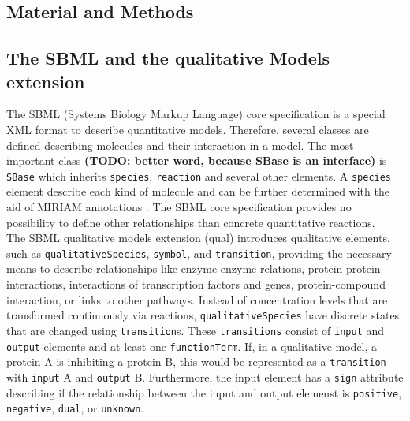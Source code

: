 \documentclass{bioinfo}
\begin{document}
\begin{methods}
\section{Material and Methods}
\subsection{The SBML and the qualitative Models extension}
The SBML (Systems Biology Markup Language) core specification is a special XML format to describe quantitative models. Therefore, several classes are defined describing molecules and their interaction in a model.
The most important class \textbf{(TODO: better word, because SBase is an interface)} is \texttt{SBase} which inherits \texttt{species}, \texttt{reaction} and several other elements.
A \texttt{species} element describe each kind of molecule and can be further determined with the aid of MIRIAM annotations \citep{Juty2012}.
The SBML core specification provides no possibility to define other relationships than concrete quantitative reactions. \citep{Hucka2003}\\
The SBML qualitative models extension (qual) introduces qualitative elements, such as \texttt{qualitativeSpecies}, \texttt{symbol}, and \texttt{transition}, providing the necessary means to describe relationships like enzyme-enzyme relations, protein-protein interactions, interactions of transcription factors and genes, protein-compound interaction, or links to other pathways.
Instead of concentration levels that are transformed continuously via reactions, \texttt{qualitativeSpecies} have discrete states that are changed using \texttt{transition}s.
These \texttt{transitions} consist of \texttt{input} and \texttt{output} elements and at least one \texttt{functionTerm}.
If, in a qualitative model, a protein A is inhibiting a protein B, this would be represented as a \texttt{transition} with \texttt{input} A and \texttt{output} B.
Furthermore, the input element has a \texttt{sign} attribute describing if the relationship between the input and output elemenst is \texttt{positive}, \texttt{negative}, \texttt{dual}, or \texttt{unknown}.

\end{methods}
\end{document}
